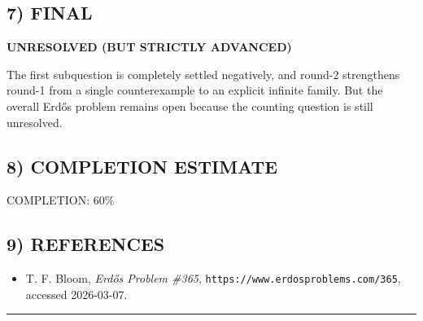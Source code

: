\subsection*{7) FINAL}
\textbf{UNRESOLVED (BUT STRICTLY ADVANCED)}

The first subquestion is completely settled negatively, and round-2 strengthens round-1 from a single counterexample to an explicit infinite family. But the overall Erd\H{o}s problem remains open because the counting question is still unresolved.

\subsection*{8) COMPLETION ESTIMATE}
COMPLETION: 60\%

\subsection*{9) REFERENCES}
\begin{itemize}
\item[Bloom365] T. F. Bloom, \emph{Erd\H{o}s Problem \#365}, \texttt{https://www.erdosproblems.com/365}, accessed 2026-03-07.
\end{itemize}

\bigskip\hrule\bigskip

